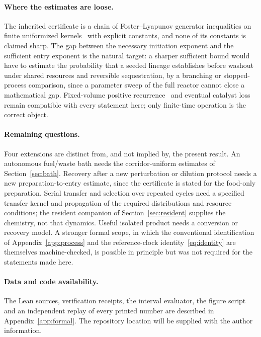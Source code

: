 \documentclass[11pt,a4paper]{article}
\newcommand{\RepositoryNote}{The repository location will be supplied with the author information.}
\theoremstyle{plain}
\theoremstyle{definition}
\theoremstyle{remark}
\begin{document}
\paragraph{Where the estimates are loose.}
The inherited certificate is a chain of Foster--Lyapunov generator inequalities on finite uniformized kernels~\citep{meyn1993,jensen1953,grassmann1977} with explicit constants, and none of its constants is claimed sharp. The gap between the necessary initiation exponent and the sufficient entry exponent is the natural target: a sharper sufficient bound would have to estimate the probability that a seeded lineage establishes before washout under shared resources and reversible sequestration, by a branching or stopped-process comparison, since a parameter sweep of the full reactor cannot close a mathematical gap. Fixed-volume positive recurrence~\citep{anderson2018} and eventual catalyst loss remain compatible with every statement here; only finite-time operation is the correct object.

\paragraph{Remaining questions.}
Four extensions are distinct from, and not implied by, the present result. An autonomous fuel/waste bath needs the corridor-uniform estimates of Section~\ref{sec:bath}. Recovery after a new perturbation or dilution protocol needs a new preparation-to-entry estimate, since the certificate is stated for the food-only preparation. Serial transfer and selection over repeated cycles need a specified transfer kernel and propagation of the required distributions and resource conditions; the resident companion of Section~\ref{sec:resident} supplies the chemistry, not that dynamics. Useful isolated product needs a conversion or recovery model. A stronger formal scope, in which the conventional identification of Appendix~\ref{app:process} and the reference-clock identity~\eqref{eq:identity} are themselves machine-checked, is possible in principle but was not required for the statements made here.

\paragraph{Data and code availability.}
The Lean sources, verification receipts, the interval evaluator, the figure script and an independent replay of every printed number are described in Appendix~\ref{app:formal}. \RepositoryNote
\end{document}
